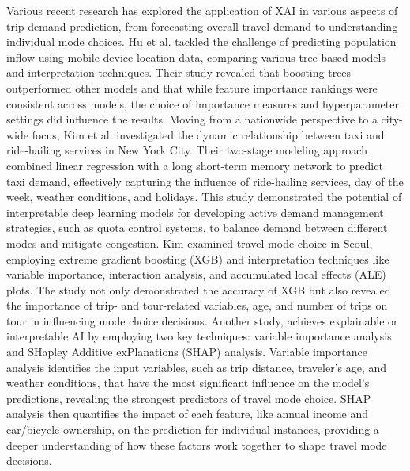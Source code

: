 Various recent research has explored the application of XAI in various aspects of trip demand prediction, from forecasting overall travel demand to understanding individual mode choices. Hu et al.\cite{hu2023examining} tackled the challenge of predicting population inflow using mobile device location data, comparing various tree-based models and interpretation techniques. Their study revealed that boosting trees outperformed other models and that while feature importance rankings were consistent across models, the choice of importance measures and hyperparameter settings did influence the results. Moving from a nationwide perspective to a city-wide focus, Kim et al. \cite{kim2020stepwise} investigated the dynamic relationship between taxi and ride-hailing services in New York City. Their two-stage modeling approach combined linear regression with a long short-term memory network to predict taxi demand, effectively capturing the influence of ride-hailing services, day of the week, weather conditions, and holidays. This study demonstrated the potential of interpretable deep learning models for developing active demand management strategies, such as quota control systems, to balance demand between different modes and mitigate congestion. Kim\cite{kim2021analysis} examined travel mode choice in Seoul, employing extreme gradient boosting (XGB) \cite{chen2015xgboost} and interpretation techniques like variable importance, interaction analysis, and accumulated local eﬀects (ALE) \cite{danesh2022interpretability} plots. The study not only demonstrated the accuracy of XGB but also revealed the importance of trip- and tour-related variables, age, and number of trips on tour in influencing mode choice decisions. Another study\cite{kashifi2022predicting}, achieves explainable or interpretable AI by employing two key techniques: variable importance analysis and SHapley Additive exPlanations (SHAP) \cite{lundberg2017unified} analysis. Variable importance analysis identifies the input variables, such as trip distance, traveler’s age, and weather conditions, that have the most significant influence on the model's predictions, revealing the strongest predictors of travel mode choice. SHAP analysis then quantifies the impact of each feature, like annual income and car/bicycle ownership, on the prediction for individual instances, providing a deeper understanding of how these factors work together to shape travel mode decisions.


